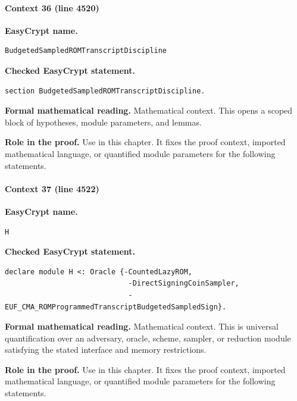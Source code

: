 \paragraph{Context 36 (line 4520)}
\noindent\textbf{EasyCrypt name.}
\begin{lstlisting}[language=EasyCrypt,basicstyle=\ttfamily\scriptsize]
BudgetedSampledROMTranscriptDiscipline
\end{lstlisting}
\noindent\textbf{Checked EasyCrypt statement.}
\begin{lstlisting}[language=EasyCrypt,basicstyle=\ttfamily\scriptsize]
section BudgetedSampledROMTranscriptDiscipline.
\end{lstlisting}
\noindent\textbf{Formal mathematical reading.}
Mathematical context. This opens a scoped block of hypotheses, module parameters, and lemmas.

\noindent\textbf{Role in the proof.}
Use in this chapter. It fixes the proof context, imported mathematical language, or quantified module parameters for the following statements.

\paragraph{Context 37 (line 4522)}
\noindent\textbf{EasyCrypt name.}
\begin{lstlisting}[language=EasyCrypt,basicstyle=\ttfamily\scriptsize]
H
\end{lstlisting}
\noindent\textbf{Checked EasyCrypt statement.}
\begin{lstlisting}[language=EasyCrypt,basicstyle=\ttfamily\scriptsize]
declare module H <: Oracle {-CountedLazyROM,
                             -DirectSigningCoinSampler,
                             -EUF_CMA_ROMProgrammedTranscriptBudgetedSampledSign}.
\end{lstlisting}
\noindent\textbf{Formal mathematical reading.}
Mathematical context. This is universal quantification over an adversary, oracle, scheme, sampler, or reduction module satisfying the stated interface and memory restrictions.

\noindent\textbf{Role in the proof.}
Use in this chapter. It fixes the proof context, imported mathematical language, or quantified module parameters for the following statements.

